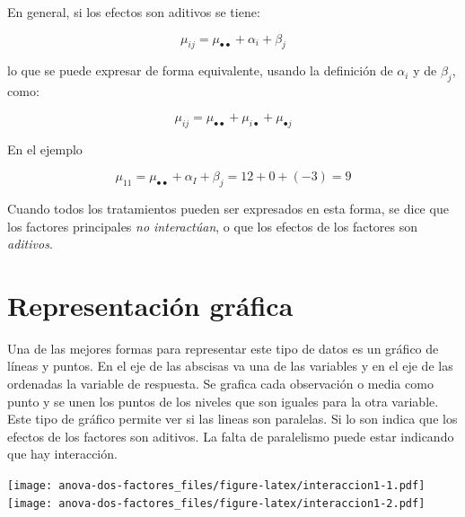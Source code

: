 \documentclass[]{book}
\theoremstyle{definition}
\theoremstyle{definition}
\theoremstyle{definition}
\theoremstyle{remark}
\begin{document}
En general, si los efectos son aditivos se tiene:

\[
\mu_{ij} = \mu_{\bullet \bullet} + \alpha_{i} + \beta_{j}
\]

lo que se puede expresar de forma equivalente, usando la definición de
\(\alpha_{i}\) y de \(\beta_{j}\), como:

\[
\mu_{ij} = \mu_{\bullet \bullet} + \mu_{i \bullet} + \mu_{\bullet j}
\]

En el ejemplo

\[
\mu_{11} = \mu_{\bullet \bullet} + \alpha_{I} + \beta_{j} = 12 + 0 + ( - 3) = 9
\]

Cuando todos los tratamientos pueden ser expresados en esta forma, se
dice que los factores principales \emph{no interactúan}, o que los
efectos de los factores son \emph{aditivos}.

\hypertarget{representacion-grafica}{%
\section{Representación gráfica}\label{representacion-grafica}}

Una de las mejores formas para representar este tipo de datos es un
gráfico de líneas y puntos. En el eje de las abscisas va una de las
variables y en el eje de las ordenadas la variable de respuesta. Se
grafica cada observación o media como punto y se unen los puntos de los
niveles que son iguales para la otra variable. Este tipo de gráfico
permite ver si las lineas son paralelas. Si lo son indica que los
efectos de los factores son aditivos. La falta de paralelismo puede
estar indicando que hay interacción.






\texttt{[image: anova-dos-factores\_files/figure-latex/interaccion1-1.pdf]}
\texttt{[image: anova-dos-factores\_files/figure-latex/interaccion1-2.pdf]}
\end{document}
